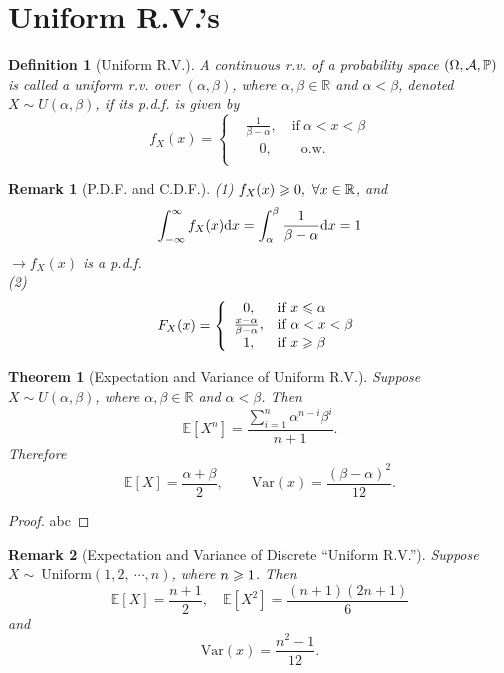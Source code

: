 \documentclass[openany,12pt]{book}
\newtheorem{theorem}{Theorem}[chapter]
\newtheorem{remark}{Remark}[chapter]
\newtheorem{definition}{Definition}[chapter]
\begin{document}
\section{Uniform R.V.'s}

\begin{definition}[Uniform R.V.]
A continuous r.v. of a probability space $(\Omega,\mathcal{A},\mathbb{P})$ is called a uniform r.v. over $(\alpha,\beta)$, where $\alpha,\beta\in\mathbb{R}$ and $\alpha<\beta$, denoted $X\sim U(\alpha,\beta)$, if its p.d.f. is given by
$$
f_{X}(x) = \left\{ \begin{aligned}
&\frac{1}{\beta - \alpha},\quad\mathrm{\text{if}}\ \alpha < x < \beta \\
&\quad0,\qquad\mathrm{\text{o.w.}}\\
\end{aligned} \right.
$$
\end{definition}

\begin{remark}[P.D.F. and C.D.F.]
(1) $f_X(x)\geqslant0,\ \forall x\in\mathbb{R}$, and
$$
\int_{-\infty}^{\infty}{f_X(x)}\mathrm{d} x=\int_{\alpha}^{\beta}\frac{1}{\beta-\alpha}\mathrm{d} x=1
$$
$\to f_X(x)$ is a p.d.f.\\
(2)
$$
F_{X}(x) = \left\{ \begin{array}{cl}
0,&\mathrm{\text{if}}\ x \leqslant \alpha \\
\frac{x - \alpha}{\beta - \alpha},&\mathrm{\text{if}}\ \alpha < x < \beta \\
1,&\mathrm{\text{if}}\ x \geqslant \beta \\
\end{array} \right.
$$
\end{remark}

\begin{theorem}[Expectation and Variance of Uniform R.V.]
Suppose $X\sim U(\alpha,\beta)$, where $\alpha,\beta\in\mathbb{R}$ and $\alpha<\beta$. Then
$$
\mathbb{E}[ X^{n}] = \frac{\sum_{i = 1}^{n}{\alpha^{n - i}\beta^{i}}}{n + 1}.
$$
Therefore
$$
\mathbb{E}[ X] = \frac{\alpha + \beta}{2},\qquad
\mathrm{Var}(x)=\frac{(\beta-\alpha)^2}{12}.
$$
\end{theorem}

\begin{proof}
  abc
\end{proof}

\begin{remark}[Expectation and Variance of Discrete ``Uniform R.V.'']
Suppose $X\sim\ \mathrm{Uniform}(1,2,\ \cdots,n)$, where $n\geqslant1$. Then
$$
\mathbb{E}[ X] = \frac{n + 1}{2},\quad \mathbb{E}\left[ X^{2}\right] = \frac{(n + 1)(2n + 1)}{6}
$$
and
$$
\mathrm{Var}(x)=\frac{n^2-1}{12}.
$$
\end{remark}
\end{document}
